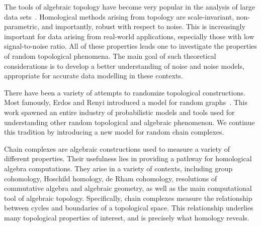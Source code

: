 
The tools of algebraic topology have become very popular in the
analysis of large data sets~\cite{carlsson_topology_2009, ghrist_barcodes:_2008,
latala_persistent_2013}. Homological methods arising from
topology are scale-invariant, non-parametric, and importantly,
robust with respect to noise. This is increasingly important
for data arising from real-world applications, especially those
with low signal-to-noise ratio. All of these properties
leads one to investigate the properties of random topological
phenomena. The main goal of such theoretical considerations is to
develop a better understanding of noise and noise models, appropriate
for accurate data modelling in these contexts.

There have been a variety of attempts to randomize topological
constructions. Most famously, Erdos and Renyi introduced a model
for random graphs~\cite{erdos_random_1959, erdos_evolution_1960}. 
This work spawned an entire industry of probabilistic
models and tools used for understanding other random topological
and algebraic phenomenon. We continue this tradition by introducing
a new model for random chain complexes.

Chain complexes are algebraic constructions used to measure a variety of 
different properties. Their usefulness lies in providing a pathway
for homological algebra computations. They arise in a variety of contexts,
including group cohomology, Hoschild homology, de Rham cohomology, 
resolutions of commutative algebra and algebraic geometry, as well
as the main computational tool of algebraic topology. Specifically,
chain complexes measure the relationship between cycles and boundaries
of a topological space. This relationship underlies many topological
properties of interest, and is precisely what homology reveals. 

%

